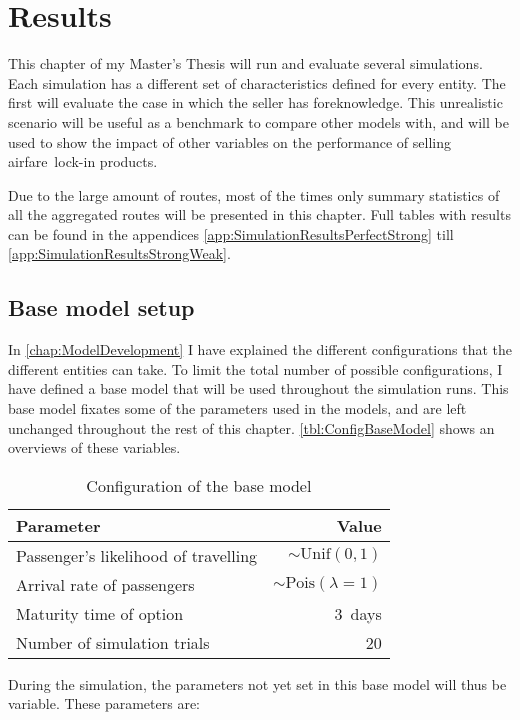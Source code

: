 \chapter{Results}
\label{chap:Results}
This chapter of my Master's Thesis will run and evaluate several simulations. Each simulation has a different set of characteristics defined for every entity. The first will evaluate the case in which the seller has foreknowledge. This unrealistic scenario will be useful as a benchmark to compare other models with, and will be used to show the impact of other variables on the performance of selling airfare~lock-in products.

Due to the large amount of routes, most of the times only summary statistics of all the aggregated routes will be presented in this chapter. Full tables with results can be found in the appendices \ref{app:SimulationResultsPerfectStrong} till \ref{app:SimulationResultsStrongWeak}.

\section{Base model setup}
In \autoref{chap:ModelDevelopment} I have explained the different configurations that the different entities can take. To limit the total number of possible configurations, I have defined a base model that will be used throughout the simulation runs. This base model fixates some of the parameters used in the models, and are left unchanged throughout the rest of this chapter. \autoref{tbl:ConfigBaseModel} shows an overviews of these variables.

 \begin{table} \centering
    \begin{tabular}{l  r}
    \toprule
    Parameter      &  Value \\
    \midrule
    Passenger's likelihood of travelling  &  $\sim \mbox{Unif}(0, 1)$  \\
    Arrival rate of passengers   &  $\sim \mbox{Pois}(\lambda=1)$ \\
    Maturity time of option      &  3~days \\
    Number of simulation trials  &  20 \\
    \bottomrule
    \end{tabular}
    \caption{Configuration of the base model}
    \label{tbl:ConfigBaseModel}
\end{table}
During the simulation, the parameters not yet set in this base model will thus be variable. These parameters are:


